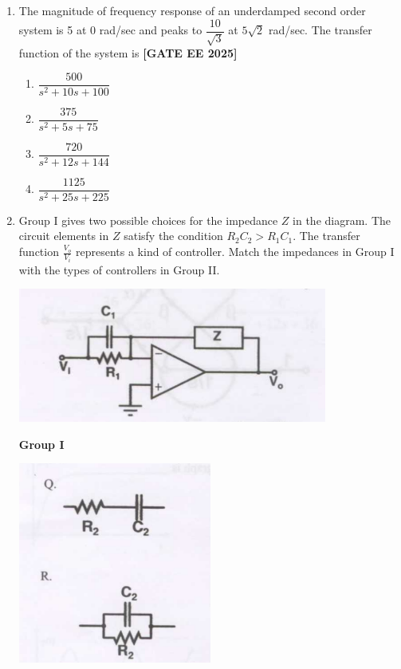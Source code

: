 \documentclass[12pt,a4paper]{article}
\begin{document}
\begin{enumerate}[leftmargin=*, label=\textbf{Q.\arabic*:}]
\item The magnitude of frequency response of an underdamped second order system is 5 at 0 rad/sec and peaks to $\dfrac{10}{\sqrt{3}}$ at $5 \sqrt{2}$ rad/sec. The transfer function of the system is
\newline
\noindent \textbf{[GATE EE 2025]}
\begin{enumerate}[label=(\Alph*)]
  \item $\dfrac{500}{s^2 + 10s + 100}$
  \item $\dfrac{375}{s^2 + 5s + 75}$
  \item $\dfrac{720}{s^2 + 12s + 144}$
  \item $\dfrac{1125}{s^2 + 25s + 225}$
\end{enumerate}

\item
Group I gives two possible choices for the impedance $Z$ in the diagram. The circuit elements in $Z$ satisfy the condition $R_2C_2 > R_1C_1$. The transfer function $\frac{V_o}{V_i}$ represents a kind of controller. Match the impedances in Group I with the types of controllers in Group II.
\begin{center}
\includegraphics[width=0.8\textwidth]{figs/q43a.png}
\end{center}
\textbf{Group I}

\includegraphics[width=0.5\textwidth]{figs/q43b.png}


\end{enumerate}
\end{document}

